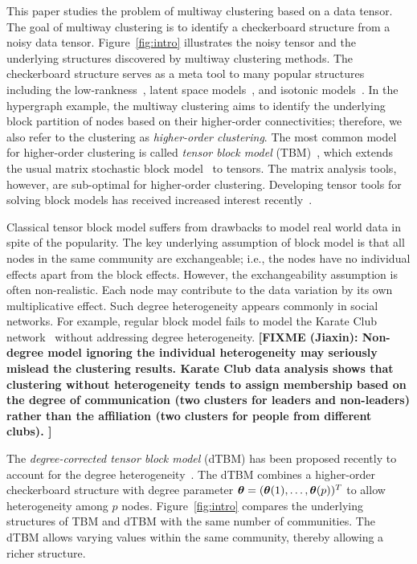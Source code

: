 \documentclass[lettersize,journal]{IEEEtran}
\theoremstyle{definition}
\theoremstyle{definition}
\def\fixme#1#2{\textbf{\color{red}[FIXME (#1): #2]}}
\begin{document}
This paper studies the problem of multiway clustering based on a data tensor. The goal of multiway clustering is to identify a checkerboard structure from a noisy data tensor. Figure~\ref{fig:intro} illustrates the noisy tensor and the underlying structures discovered by multiway clustering methods. The checkerboard structure serves as a meta tool to many popular structures including the low-rankness~\citep{young2018universality}, latent space models~\citep{wang2018learning}, and isotonic models~\citep{pananjady2020isotonic}. In the hypergraph example, the multiway clustering aims to identify the underlying block partition of nodes based on their higher-order connectivities; therefore, we also refer to the clustering as \emph{higher-order clustering}. The most common model for higher-order clustering is called \emph{tensor block model} (TBM)~\citep{wang2019multiway}, which extends the usual matrix stochastic block model~\citep{abbe2017community} to tensors. 
The matrix analysis tools, however, are sub-optimal for higher-order clustering. Developing tensor tools for solving block models has received increased interest recently~\citep{ wang2019multiway,chi2020provable,han2020exact}. 


Classical tensor block model suffers from drawbacks to model real world data in spite of the popularity. The key underlying assumption of block model is that all nodes in the same community are exchangeable; i.e., the nodes have no individual effects apart from the block effects. However, the exchangeability assumption is often non-realistic. Each node may contribute to the data variation by its own multiplicative effect. Such degree heterogeneity appears commonly in social networks. For example, regular block model fails to model the Karate Club network~\citep{bickel2009nonparametric} without addressing
degree heterogeneity. 
\fixme{Jiaxin}{Non-degree model ignoring the individual heterogeneity may seriously mislead the clustering results. Karate Club data analysis shows that clustering without heterogeneity tends to assign membership based on the degree of communication (two clusters for leaders and non-leaders) rather than the affiliation (two clusters for people from different clubs). }

The \emph{degree-corrected tensor block model} (dTBM) has been proposed recently to account for the degree heterogeneity~\citep{ke2019community}. The dTBM combines a higher-order checkerboard structure with degree parameter $\boldsymbol{\theta}=(\boldsymbol{\theta}(1),\ldots,\boldsymbol{\theta}(p))^T$ to allow heterogeneity among $p$ nodes.  Figure~\ref{fig:intro} compares the underlying structures of TBM and dTBM with the same number of communities. The dTBM allows varying values within the same community, thereby allowing a richer structure. 
\end{document}
